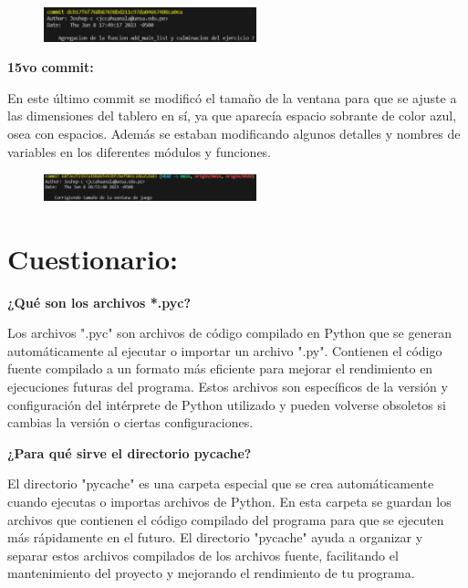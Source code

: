 \documentclass{article}
\begin{document}
	\begin{figure}[H]
		\centering
		\includegraphics[width=0.55\textwidth,keepaspectratio]{img/commit14.png}
	\end{figure}
	
	\textbf{15vo commit:}
	
	\vspace{0.3cm}
	En este último commit se modificó el tamaño de la ventana para que se ajuste a las dimensiones del tablero en sí, ya que aparecía espacio sobrante de color azul, osea con espacios. Además se estaban modificando algunos detalles y nombres de variables en los diferentes módulos y funciones.
	\vspace{0.3cm}
	
	\begin{figure}[H]
		\centering
		\includegraphics[width=0.55\textwidth,keepaspectratio]{img/commit15.png}
	\end{figure}


	\section{Cuestionario:}
	
	\textbf{¿Qué son los archivos *.pyc?}
	
	\vspace{0.3cm}
	Los archivos ".pyc" son archivos de código compilado en Python que se generan automáticamente al ejecutar o importar un archivo ".py". Contienen el código fuente compilado a un formato más eficiente para mejorar el rendimiento en ejecuciones futuras del programa. Estos archivos son específicos de la versión y configuración del intérprete de Python utilizado y pueden volverse obsoletos si cambias la versión o ciertas configuraciones.
	\vspace{0.3cm}
	
	\textbf{¿Para qué sirve el directorio pycache?}
	
	\vspace{0.3cm}
	El directorio "pycache" es una carpeta especial que se crea automáticamente cuando ejecutas o importas archivos de Python. En esta carpeta se guardan los archivos que contienen el código compilado del programa para que se ejecuten más rápidamente en el futuro. El directorio "pycache" ayuda a organizar y separar estos archivos compilados de los archivos fuente, facilitando el mantenimiento del proyecto y mejorando el rendimiento de tu programa.
	\vspace{0.3cm}
	
\end{document}
